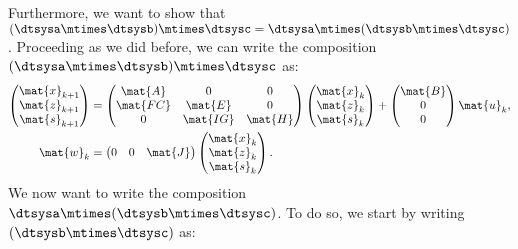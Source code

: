 Furthermore, we want to show that~$(\dtsysa\mtimes \dtsysb)\mtimes \dtsysc=\dtsysa\mtimes (\dtsysb\mtimes \dtsysc)$.
Proceeding as we did before, we can write the composition~$(\dtsysa\mtimes \dtsysb)\mtimes \dtsysc$ as:
\begin{equation*}
    \label{eq:dlin-5}
    \begin{aligned}
        \begin{pmatrix}
            \mat{x}_{k+1} \\
            \mat{z}_{k+1} \\
            \mat{s}_{k+1}
        \end{pmatrix}&=
        \begin{pmatrix}
            \mat{A}  & 0        & 0       \\
            \mat{FC} & \mat{E}  & 0       \\
            0        & \mat{IG} & \mat{H}
        \end{pmatrix}\begin{pmatrix}
                         \mat{x}_k\\ \mat{z}_k\\ \mat{s}_k
        \end{pmatrix}+
        \begin{pmatrix}
            \mat{B}\\ 0\\ 0
        \end{pmatrix}\mat{u}_k,\\
        \mat{w}_k&=\begin{pmatrix}
                       0& 0& \mat{J}
        \end{pmatrix}\begin{pmatrix}
                         \mat{x}_k\\ \mat{z}_k\\ \mat{s}_k
        \end{pmatrix}.
    \end{aligned}
\end{equation*}
We now want to write the composition~$\dtsysa\mtimes (\dtsysb\mtimes \dtsysc)$.
To do so, we start by writing~$(\dtsysb\mtimes \dtsysc)$ as:
